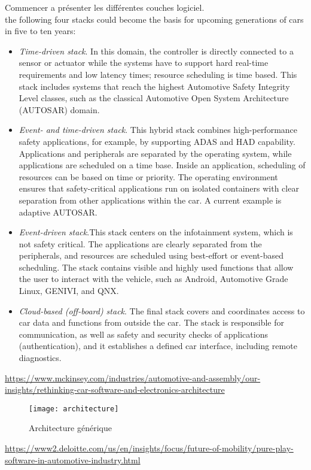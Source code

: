 \begin{tbd}
Commencer a pr\'esenter les diff\'erentes couches logiciel.\\

the following four stacks could become the basis for upcoming generations of cars in five to ten years:
\begin{itemize}

\item \emph{Time-driven stack}. In this domain, the controller is directly connected to a sensor or actuator while the systems have to support hard real-time requirements and low latency times; resource scheduling is time based. This stack includes systems that reach the highest Automotive Safety Integrity Level classes, such as the classical Automotive Open System Architecture (AUTOSAR) domain.
\item \emph{Event- and time-driven stack}. This hybrid stack combines high-performance safety applications, for example, by supporting ADAS and HAD capability. Applications and peripherals are separated by the operating system, while applications are scheduled on a time base. Inside an application, scheduling of resources can be based on time or priority. The operating environment ensures that safety-critical applications run on isolated containers with clear separation from other applications within the car. A current example is adaptive AUTOSAR.
\item \emph{Event-driven stack}.This stack centers on the infotainment system, which is not safety critical. The applications are clearly separated from the peripherals, and resources are scheduled using best-effort or event-based scheduling. The stack contains visible and highly used functions that allow the user to interact with the vehicle, such as Android, Automotive Grade Linux, GENIVI, and QNX.
\item \emph{Cloud-based (off-board) stack}. The final stack covers and coordinates access to car data and functions from outside the car. The stack is responsible for communication, as well as safety and security checks of applications (authentication), and it establishes a defined car interface, including remote diagnostics.
\end{itemize}

\url{https://www.mckinsey.com/industries/automotive-and-assembly/our-insights/rethinking-car-software-and-electronics-architecture}
\end{tbd}



\begin{figure}
    \texttt{[image: architecture]}
    \caption{Architecture g\'en\'erique}
    \label{fig:archi}
\end{figure}
\url{https://www2.deloitte.com/us/en/insights/focus/future-of-mobility/pure-play-software-in-automotive-industry.html}
